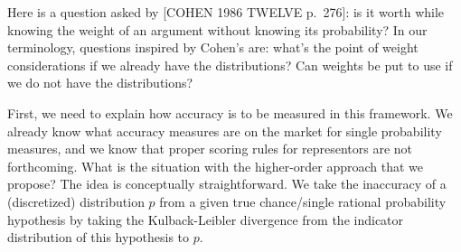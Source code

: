 \documentclass[
  10pt,
  dvipsnames,enabledeprecatedfontcommands]{scrartcl}
\begin{document}
Here is a question asked by {[}COHEN 1986 TWELVE p.~276{]}: is it worth
while knowing the weight of an argument without knowing its probability?
In our terminology, questions inspired by Cohen's are: what's the point
of weight considerations if we already have the distributions? Can
weights be put to use if we do not have the distributions?

First, we need to explain how accuracy is to be measured in this
framework. We already know what accuracy measures are on the market for
single probability measures, and we know that proper scoring rules for
representors are not forthcoming. What is the situation with the
higher-order approach that we propose? The idea is conceptually
straightforward. We take the inaccuracy of a (discretized) distribution
\(p\) from a given true chance/single rational probability hypothesis by
taking the Kulback-Leibler divergence from the indicator distribution of
this hypothesis to \(p\).
\end{document}
